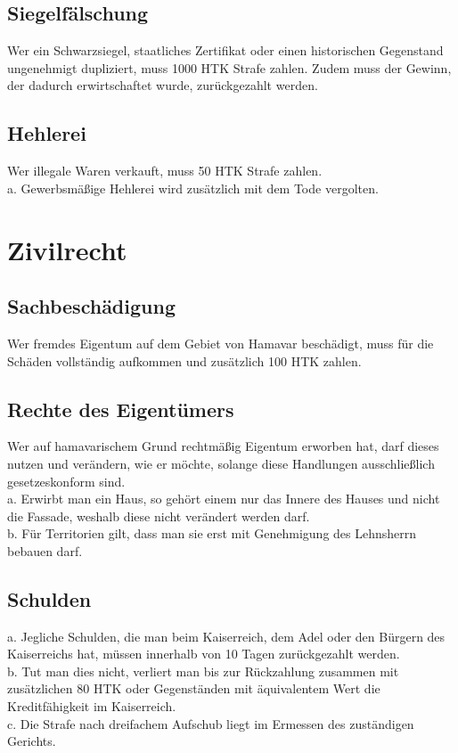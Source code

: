 \documentclass{article}
\begin{document}
\subsection{Siegelfälschung}
Wer ein Schwarzsiegel, staatliches Zertifikat oder einen historischen Gegenstand ungenehmigt dupliziert, muss 1000 HTK Strafe zahlen. Zudem muss der Gewinn, der dadurch erwirtschaftet wurde, zurückgezahlt werden.

\subsection{Hehlerei}
Wer illegale Waren verkauft, muss 50 HTK Strafe zahlen.\\
a. Gewerbsmäßige Hehlerei wird zusätzlich mit dem Tode vergolten.

\section{Zivilrecht}
\subsection{Sachbeschädigung}
Wer fremdes Eigentum auf dem Gebiet von Hamavar beschädigt, muss für die Schäden vollständig aufkommen und zusätzlich 100 HTK zahlen.

\subsection{Rechte des Eigentümers}
Wer auf hamavarischem Grund rechtmäßig Eigentum erworben hat, darf dieses nutzen und verändern, wie er möchte, solange diese Handlungen ausschließlich gesetzeskonform sind.\\
a. Erwirbt man ein Haus, so gehört einem nur das Innere des Hauses und nicht die Fassade, weshalb diese nicht verändert werden darf.\\
b. Für Territorien gilt, dass man sie erst mit Genehmigung des Lehnsherrn bebauen darf.

\subsection{Schulden}
a. Jegliche Schulden, die man beim Kaiserreich, dem Adel oder den Bürgern des Kaiserreichs hat, müssen innerhalb von 10 Tagen zurückgezahlt werden.\\
b. Tut man dies nicht, verliert man bis zur Rückzahlung zusammen mit zusätzlichen 80 HTK oder Gegenständen mit äquivalentem Wert die Kreditfähigkeit im Kaiserreich.\\
c. Die Strafe nach dreifachem Aufschub liegt im Ermessen des zuständigen Gerichts.
\end{document}
